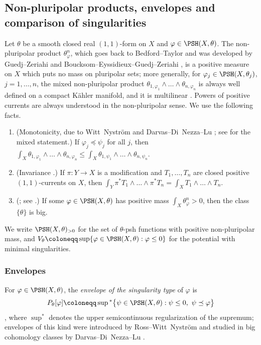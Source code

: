 \subsection{Non-pluripolar products, envelopes and comparison of
singularities}\label{nk:sec:npp}

Let $\theta$ be a smooth closed real $(1,1)$-form on $X$ and
$\varphi\in\PSH(X,\theta)$. The non-pluripolar product
$\theta_\varphi^n$, which goes back to Bedford--Taylor \cite{BT87} and
was developed by Guedj--Zeriahi \cite{GZ07} and
Boucksom--Eyssidieux--Guedj--Zeriahi
\cite{BEGZ10}, is a positive measure on $X$ which puts no mass on
pluripolar sets; more generally, for $\varphi_j\in\PSH(X,\theta_j)$,
$j=1,\dots,n$, the mixed non-pluripolar product
$\theta_{1,\varphi_1}\wedge\dots\wedge\theta_{n,\varphi_n}$ is always
well defined on a compact K\"ahler manifold, and it is multilinear
\cite[Proposition~2.2.1]{SGPT}. Powers of positive currents are always
understood in the non-pluripolar sense. We use the following facts.
\begin{enumerate}[label=(\alph*),leftmargin=*,itemsep=.2em,topsep=.3em]
\item\label{nk:it:monotone} (Monotonicity, due to Witt~Nystr\"om \cite{WN19}
  and Darvas--Di~Nezza--Lu \cite{DDNL18mono}; see
  \cite[Theorem~2.4.3]{SGPT} for the mixed statement.) If
  $\varphi_j\preceq\psi_j$ for all $j$, then
  $\int_X\theta_{1,\varphi_1}\wedge\dots\wedge\theta_{n,\varphi_n}
  \le\int_X\theta_{1,\psi_1}\wedge\dots\wedge\theta_{n,\psi_n}$.
\item\label{nk:it:invariance} (Invariance \cite[Proposition~2.4.2]{SGPT}.)
  If $\pi\colon Y\to X$ is a modification and $T_1,\dots,T_n$ are
  closed positive $(1,1)$-currents on $X$, then
  $\int_Y\pi^*T_1\wedge\dots\wedge\pi^*T_n=\int_XT_1\wedge\dots\wedge T_n$.
\item\label{nk:it:bigness} (\cite[Proposition~1.22]{BEGZ10}; see
  \cite[Proposition~2.4.1]{SGPT}.) If some $\varphi\in\PSH(X,\theta)$
  has positive mass $\int_X\theta_\varphi^n>0$, then the class
  $\{\theta\}$ is big.
\end{enumerate}
We write $\PSH(X,\theta)_{>0}$ for the set of $\theta$-psh functions with
positive non-pluripolar mass, and
$V_\theta\coloneqq \sup\{\varphi\in\PSH(X,\theta):\varphi\le0\}$ for the potential
with minimal singularities.

\subsubsection*{Envelopes}
For $\varphi\in\PSH(X,\theta)$, the \emph{envelope of the singularity
type} of $\varphi$ is
\[
  P_\theta[\varphi]
  \coloneqq \sup{}^*\bigl\{\psi\in\PSH(X,\theta):\psi\le0,\ \psi\preceq\varphi\bigr\}
\]
\cite[Definition~3.1.2]{SGPT}, where $\sup^*$ denotes the upper
semicontinuous regularization of the supremum; envelopes of this kind
were introduced by Ross--Witt~Nystr\"om \cite{RWN14} and studied in big
cohomology classes by Darvas--Di~Nezza--Lu
\cite{DDNL18full,DDNL18mono}.

